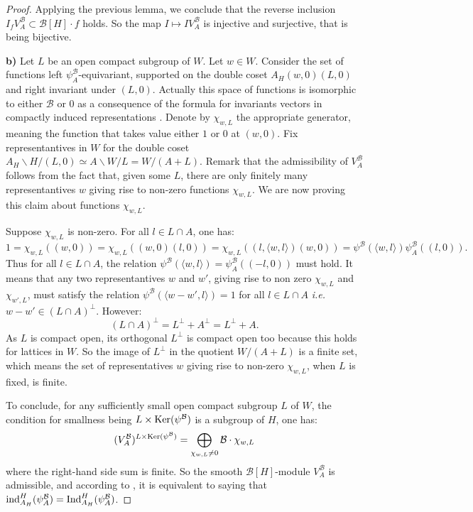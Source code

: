 \documentclass[11pt]{article}
\theoremstyle{plain}
\theoremstyle{definition}
\theoremstyle{plain}
\theoremstyle{definition}
\theoremstyle{plain}
\begin{document}
\begin{proof}
Applying the previous lemma, we conclude that the reverse inclusion $I_f V_A^{\mathcal{B}} \subset \mathcal{B}[H] \cdot f$ holds. So the map $I \mapsto I V_A^\mathcal{B}$ is injective and surjective, that is being bijective.

\noindent \textbf{b)} Let $L$ be an open compact subgroup of $W$. Let $w \in W$. Consider the set of functions left $\psi_A^\mathcal{B}$-equivariant, supported on the double coset $A_H (w,0) (L,0)$ and right invariant under $(L,0)$. Actually this space of functions is isomorphic to either $\mathcal{B}$ or $0$ as a consequence of the formula for invariants vectors in compactly induced representations \cite[I.5.6]{vig_book}. Denote by $\chi_{w,L}$ the appropriate generator, meaning the function that takes value either $1$ or $0$ at $(w,0)$. Fix representantives in $W$ for the double coset $A_H \backslash H / (L,0) \simeq A \backslash W / L = W/ (A+L)$. Remark that the admissibility of $V_A^\mathcal{B}$ follows from the fact that, given some $L$, there are only finitely many representantives $w$ giving rise to non-zero functions $\chi_{w,L}$. We are now proving this claim about functions $\chi_{w,L}$.

Suppose $\chi_{w,L}$ is non-zero. For all $l \in L \cap A$, one has:
$$1=\chi_{w,L}((w,0))=\chi_{w,L}((w,0)(l,0))= \chi_{w,L}((l,\langle w,l \rangle )(w,0))=\psi^\mathcal{B}(\langle w,l \rangle )\psi_A^\mathcal{B}((l,0)).$$
Thus for all $l \in L \cap A$, the relation $\psi^\mathcal{B}(\langle w,l \rangle) = \psi_A^{\mathcal{B}}((-l,0))$ must hold. It means that any two representantives $w$ and $w'$, giving rise to non zero $\chi_{w,L}$ and $\chi_{w',L}$, must satisfy the relation $\psi^\mathcal{B}(\langle w-w',l \rangle)=1$ for all $l \in L \cap A$ \textit{i.e.} $w-w' \in (L \cap A)^\perp$. However:
$$(L \cap A)^\perp = L^\perp + A^\perp = L^\perp + A.$$
As $L$ is compact open, its orthogonal $L^\perp$ is compact open too because this holds for lattices in $W$. So the image of $L^\perp$ in the quotient $W/(A+L)$ is a finite set, which means the set of representatives $w$ giving rise to non-zero $\chi_{w,L}$, when $L$ is fixed, is finite.

To conclude, for any sufficiently small open compact subgroup $L$ of $W$, the condition for smallness being $L \times \textup{Ker}(\psi^\mathcal{B})$ is a subgroup of $H$, one has:
$$(V_A^\mathcal{B})^{L \times \textup{Ker}(\psi^\mathcal{B})} = \bigoplus_{\chi_{w,L} \neq 0} \mathcal{B} \cdot \chi_{w,L}$$
where the right-hand side sum is finite. So the smooth $\mathcal{B}[H]$-module $V_A^\mathcal{B}$ is admissible, and according to \cite[I.5.6 1)]{vig_book}, it is equivalent to saying that $\textup{ind}_{A_H}^H(\psi_A^\mathcal{B})  = \textup{Ind}_{A_H}^H(\psi_A^\mathcal{B})$.


\end{proof}
\end{document}
